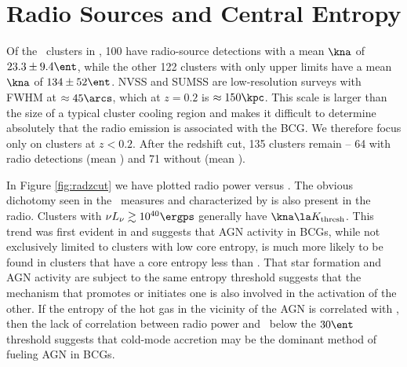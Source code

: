 \section{Radio Sources and Central Entropy}
\label{sec:haradagn}

Of the \entsuppnum\ clusters in \accept, 100 have radio-source
detections with a mean $\kna$ of $23.3 \pm 9.4 \ent$, while the other
122 clusters with only upper limits have a mean $\kna$ of $134 \pm 52
\ent$. NVSS and SUMSS are low-resolution surveys with FWHM at $\approx
45\arcs$, which at $z = 0.2$ is $\approx 150\kpc$. This scale is larger
than the size of a typical cluster cooling region and makes it
difficult to determine absolutely that the radio emission is
associated with the BCG. We therefore focus only on clusters at $z <
0.2$. After the redshift cut, 135 clusters remain -- 64 with radio
detections (mean \frad) and 71 without (mean \nfrad).

In Figure \ref{fig:radzcut} we have plotted radio power versus \kna.
The obvious dichotomy seen in the \halpha\ measures and characterized
by \kthr is also present in the radio. Clusters with $\nu L_{\nu}
\gtrsim 10^{40} \ergps$ generally have $\kna \la \kthr$. This trend
was first evident in \citet{radioquiet} and suggests that AGN activity
in BCGs, while not exclusively limited to clusters with low core
entropy, is much more likely to be found in clusters that have a core
entropy less than \kthr. That star formation and AGN activity are
subject to the same entropy threshold suggests that the mechanism
that promotes or initiates one is also involved in the activation of
the other. If the entropy of the hot gas in the vicinity of the AGN is
correlated with \kna, then the lack of correlation between radio power
and \kna\ below the $30 \ent$ threshold suggests that cold-mode
accretion \citep{pizzolato05, hardcastle07} may be the dominant method
of fueling AGN in BCGs.

